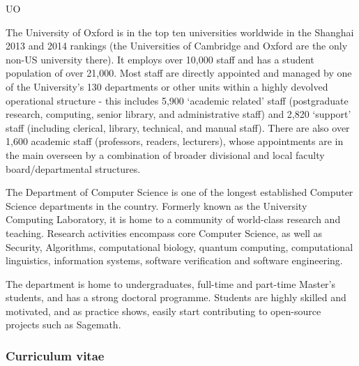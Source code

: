 \begin{sitedescription}{UO}



The University of Oxford is in the top ten universities worldwide in the Shanghai 2013 and 2014
rankings (the Universities of Cambridge and Oxford are the only non-US university there).
It employs over 10,000 staff and has a student population of over 21,000.
Most staff are directly appointed and managed by one of the University’s 130 departments or
other units within a highly devolved operational structure - this includes 5,900 ‘academic related’
staff (postgraduate research, computing, senior library, and administrative staff) and
2,820 ‘support’ staff (including clerical, library, technical, and manual staff). There are also
over 1,600 academic staff (professors, readers, lecturers), whose appointments are in the
main overseen by a combination of broader divisional and local faculty board/departmental
structures. 

The Department of Computer Science is one of the longest established
Computer Science departments in the country. Formerly known as the
University Computing Laboratory, it is home to a community of world-class research and
teaching. Research activities encompass core Computer Science, as well as Security,
Algorithms, computational biology, quantum computing, computational linguistics,
information systems, software verification and software engineering. 

The department is home to undergraduates, full-time and part-time Master's
students, and has a strong doctoral programme.  Students are highly skilled and
motivated, and as practice shows, easily start contributing to open-source
projects such as Sagemath.

\subsubsection*{Curriculum vitae}






\end{sitedescription}
